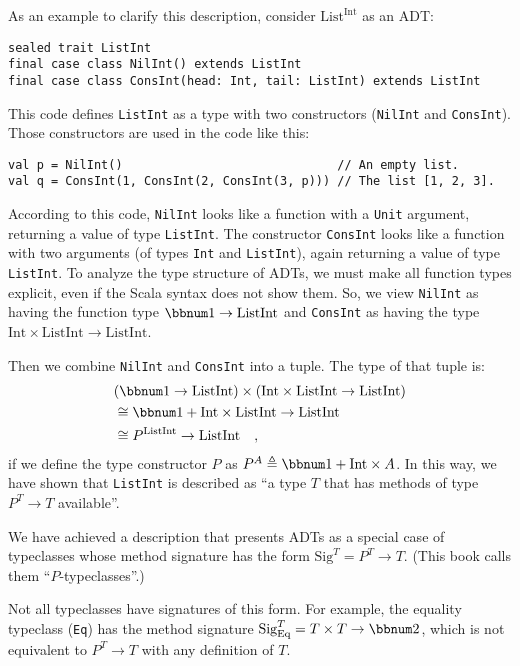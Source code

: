 As an example to clarify this description, consider $\text{List}^{\text{Int}}$
as an ADT:
\begin{lstlisting}
sealed trait ListInt
final case class NilInt() extends ListInt
final case class ConsInt(head: Int, tail: ListInt) extends ListInt
\end{lstlisting}
This code defines \lstinline!ListInt! as a type with two constructors
(\lstinline!NilInt! and \lstinline!ConsInt!). Those constructors
are used in the code like this:
\begin{lstlisting}
val p = NilInt()                              // An empty list.
val q = ConsInt(1, ConsInt(2, ConsInt(3, p))) // The list [1, 2, 3].
\end{lstlisting}
According to this code, \lstinline!NilInt! looks like a function
with a \lstinline!Unit! argument, returning a value of type \lstinline!ListInt!.
The constructor \lstinline!ConsInt! looks like a function with two
arguments (of types \lstinline!Int! and \lstinline!ListInt!), again
returning a value of type \lstinline!ListInt!. To analyze the type
structure of ADTs, we must make all function types explicit, even
if the Scala syntax does not show them. So, we view \lstinline!NilInt!
as having the function type $\bbnum 1\rightarrow\text{ListInt}$ and
\lstinline!ConsInt! as having the type $\text{Int}\times\text{ListInt}\rightarrow\text{ListInt}$.

Then we combine \lstinline!NilInt! and \lstinline!ConsInt! into
a tuple. The type of that tuple is:
\begin{align*}
 & (\bbnum 1\rightarrow\text{ListInt})\times(\text{Int}\times\text{ListInt}\rightarrow\text{ListInt})\\
 & \cong\bbnum 1+\text{Int}\times\text{ListInt}\rightarrow\text{ListInt}\\
 & \cong P^{\text{ListInt}}\rightarrow\text{ListInt}\quad,
\end{align*}
if we define the type constructor $P$ as $P^{A}\triangleq\bbnum 1+\text{Int}\times A$.
In this way, we have shown that \lstinline!ListInt! is described
as \textsf{``}a type $T$ that has methods of type $P^{T}\rightarrow T$ available\textsf{''}.

We have achieved a description that presents ADTs as a special case
of typeclasses whose method signature has the form $\text{Sig}^{T}=P^{T}\rightarrow T$.
(This book calls them \textsf{``}$P$-typeclasses\textsf{''}.)

Not all typeclasses have signatures of this form. For example, the
equality typeclass (\lstinline!Eq!) has the method signature $\text{Sig}_{\text{Eq}}^{T}=T\times T\rightarrow\bbnum 2$,
which is not equivalent to $P^{T}\rightarrow T$ with any definition
of $T$.

